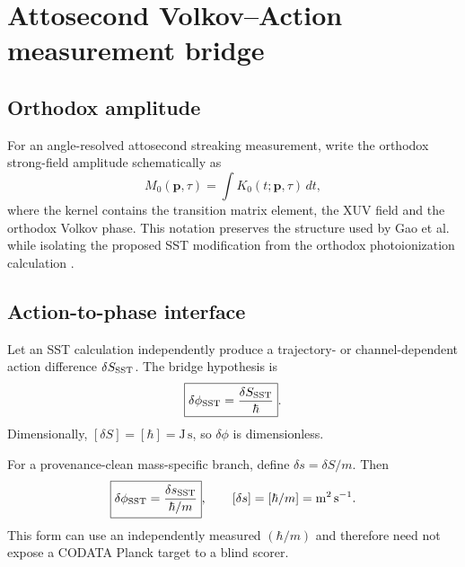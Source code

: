 \providecommand{\vSwirl}{\mathbf{v}_{\!\boldsymbol{\circlearrowleft}}}
\providecommand{\rhoF}{\rho_{\!f}}
\providecommand{\rhoE}{\rho_{\!E}}
\providecommand{\rhoM}{\rho_{\!m}}

\section{Attosecond Volkov--Action measurement bridge}
\label{sec:attosecond-volkov-action-bridge}

\subsection{Orthodox amplitude}
For an angle-resolved attosecond streaking measurement, write the orthodox strong-field amplitude schematically as
\begin{equation}
M_0(\mathbf p,\tau)
 =\int K_0(t;\mathbf p,\tau)\,dt,
\end{equation}
where the kernel contains the transition matrix element, the XUV field and the orthodox Volkov phase. This notation preserves the structure used by Gao et al. while isolating the proposed SST modification from the orthodox photoionization calculation \cite{Gao2026Attosecond,Keathley2016VTGPA}.

\subsection{Action-to-phase interface}
Let an SST calculation independently produce a trajectory- or channel-dependent action difference \(\delta S_{\rm SST}\). The bridge hypothesis is
\begin{equation}
\boxed{\delta\phi_{\rm SST}=\frac{\delta S_{\rm SST}}{\hbar}}.
\end{equation}
Dimensionally, \([\delta S]=[\hbar]=\mathrm{J\,s}\), so \(\delta\phi\) is dimensionless.

For a provenance-clean mass-specific branch, define \(\delta s=\delta S/m\). Then
\begin{equation}
\boxed{
\delta\phi_{\rm SST}
=\frac{\delta s_{\rm SST}}{\hbar/m}
},
\qquad
[\delta s]=[\hbar/m]=\mathrm{m^2\,s^{-1}}.
\end{equation}
This form can use an independently measured \((\hbar/m)\) and therefore need not expose a CODATA Planck target to a blind scorer.


